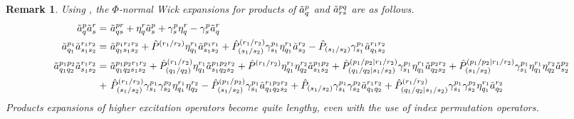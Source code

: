 \documentclass[11pt,fleqn]{article}
\newcommand{\g}{\gamma}      %
\newcommand{\h}{\eta}        %
\newcommand{\F}{\Phi}        %
\newcommand{\tl}{\ensuremath{\tilde}}
\newcommand{\op}[1]{\ensuremath{\hat{#1}}}
\theoremstyle{mystyle}
\newtheorem{rmk}{Remark}[section]
\numberwithin{equation}{section}
\begin{document}
\begin{rmk}
Using , the $\F$-normal Wick expansions for products of $\tl{a}_q^p$ and $\tl{a}_{rs}^{pq}$ are as follows.
{\setlength{\mathindent}{1em}
\begin{align*}
  \tl{a}_q^p
  \tl{a}_s^r
=&\
  \tl{a}_{qs}^{pr}
+
  \h_q^r\tl{a}_s^p
+
  \g_s^p\h_q^r
-
  \g_s^p\tl{a}_q^r
\\
  \tl{a}_{q_1}^{p_1}
  \tl{a}_{s_1s_2}^{r_1r_2}
=&\
  \tl{a}_{q_1s_1s_2}^{p_1r_1r_2}
+
  \op{P}^{(r_1/r_2)}
  \h_{q_1}^{r_1}
  \tl{a}_{s_1s_2}^{p_1r_1}
+
  \op{P}^{(r_1/r_2)}_{(s_1/s_2)}
  \g_{s_1}^{p_1}
  \h_{q_1}^{r_1}
  \tl{a}_{s_2}^{r_2}
-
  \op{P}_{(s_1/s_2)}
  \g_{s_1}^{p_1}
  \tl{a}_{q_1s_2}^{r_1r_2}
\\
  \tl{a}_{q_1q_2}^{p_1p_2}
  \tl{a}_{s_1s_2}^{r_1r_2}
=&\
  \tl{a}_{q_1q_2s_1s_2}^{p_1p_2r_1r_2}
+
  \op{P}^{(r_1/r_2)}_{(q_1/q_2)}
  \h_{q_1}^{r_1}
  \tl{a}_{s_1q_2s_2}^{p_1p_2r_2}
+
  \op{P}^{(r_1/r_2)}
  \h_{q_1}^{r_1}\h_{q_2}^{r_2}
  \tl{a}_{s_1s_2}^{p_1p_2}
+
  \op{P}^{(p_1/p_2|r_1/r_2)}_{(q_1/q_2|s_1/s_2)}
  \g_{s_1}^{p_1}\h_{q_1}^{r_1}
  \tl{a}_{q_2s_2}^{p_2r_2}
+
  \op{P}^{(p_1/p_2|r_1/r_2)}_{(s_1/s_2)}
  \g_{s_1}^{p_1}\h_{q_1}^{r_1}\h_{q_2}^{r_2}
  \tl{a}_{s_2}^{p_2}
\\
+&\
  \op{P}^{(r_1/r_2)}_{(s_1/s_2)}
  \g_{s_1}^{p_1}\g_{s_2}^{p_2}\h_{q_1}^{r_1}\h_{q_2}^{r_2}
-
  \op{P}^{(p_1/p_2)}_{(s_1/s_2)}
  \g_{s_1}^{p_1}
  \tl{a}_{q_1q_2s_2}^{r_1p_2r_2}
+
  \op{P}_{(s_1/s_2)}
  \g_{s_1}^{p_1}\g_{s_2}^{p_2}
  \tl{a}_{q_1q_2}^{r_1r_2}
+
  \op{P}^{(r_1/r_2)}_{(q_1/q_2|s_1/s_2)}
  \g_{s_1}^{p_1}\g_{s_2}^{p_2}
  \h_{q_1}^{r_1}
  \tl{a}_{q_2}^{r_2}
\end{align*}}
Products expansions of higher excitation operators become quite lengthy, even with the use of index permutation operators.
\end{rmk}
\end{document}
